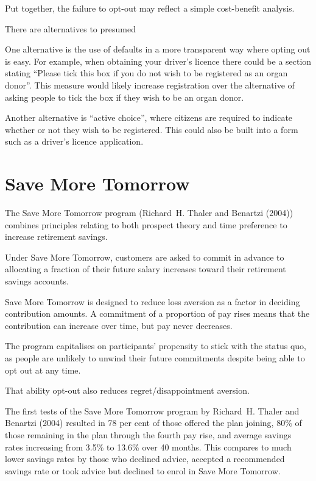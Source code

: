 \documentclass[
  letterpaper,
  DIV=11,
  numbers=noendperiod]{scrreprt}
\begin{document}
Put together, the failure to opt-out may reflect a simple cost-benefit
analysis.

There are alternatives to presumed

One alternative is the use of defaults in a more transparent way where
opting out is easy. For example, when obtaining your driver's licence
there could be a section stating ``Please tick this box if you do not
wish to be registered as an organ donor''. This measure would likely
increase registration over the alternative of asking people to tick the
box if they wish to be an organ donor.

Another alternative is ``active choice'', where citizens are required to
indicate whether or not they wish to be registered. This could also be
built into a form such as a driver's licence application.

\hypertarget{save-more-tomorrow}{%
\section{Save More Tomorrow}\label{save-more-tomorrow}}

The Save More Tomorrow program (Richard~H. Thaler and Benartzi (2004))
combines principles relating to both prospect theory and time preference
to increase retirement savings.

Under Save More Tomorrow, customers are asked to commit in advance to
allocating a fraction of their future salary increases toward their
retirement savings accounts.

Save More Tomorrow is designed to reduce loss aversion as a factor in
deciding contribution amounts. A commitment of a proportion of pay rises
means that the contribution can increase over time, but pay never
decreases.

The program capitalises on participants' propensity to stick with the
status quo, as people are unlikely to unwind their future commitments
despite being able to opt out at any time.

That ability opt-out also reduces regret/disappointment aversion.

The first tests of the Save More Tomorrow program by Richard~H. Thaler
and Benartzi (2004) resulted in 78 per cent of those offered the plan
joining, 80\% of those remaining in the plan through the fourth pay
rise, and average savings rates increasing from 3.5\% to 13.6\% over 40
months. This compares to much lower savings rates by those who declined
advice, accepted a recommended savings rate or took advice but declined
to enrol in Save More Tomorrow.
\end{document}

